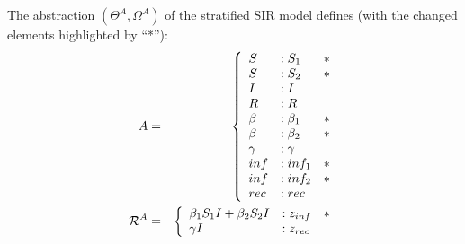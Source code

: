 \begin{example}\label{ex:abstraction}
    The abstraction $(\Theta^{A}, \Omega^{A})$ of the stratified SIR model defines
    (with the changed elements highlighted by ``*''):
    \begin{eqnarray*}
        A &=& \left\{ 
            \begin{array}{lll}
                S &: S_1 &*\\
                S &: S_2&*\\
                I &: I\\
                R &: R\\
               \beta &: \beta_1&*\\
               \beta &: \beta_2&*\\
               \gamma &: \gamma\\
               inf&: inf_1&*\\
               inf&: inf_2&*\\
               rec&: rec\\
            \end{array}\right.\\
            {\cal R}^A &=& \left\{ 
            \begin{array}{lll}
                \beta_1 S_1 I +  \beta_2 S_2 I& : z_{inf}&* \\
                \gamma I  & : z_{rec}\\
            \end{array}\right.\\
    \end{eqnarray*}
\end{example}

